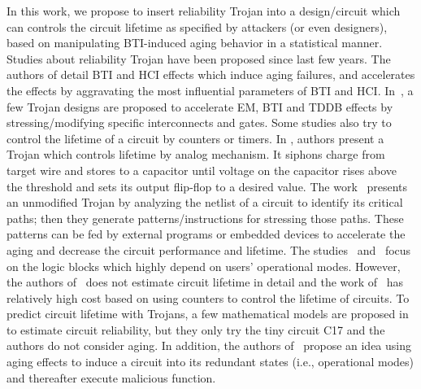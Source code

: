 In this work, we propose to insert reliability Trojan into a design/circuit which can controls the circuit lifetime as specified by attackers (or even designers), based on manipulating BTI-induced aging behavior in a statistical manner. Studies about reliability Trojan have been proposed since last few years. The authors of \cite{shiyanovskii2010process} detail BTI and HCI effects which induce aging failures, and accelerates the effects by aggravating the most influential parameters of BTI and HCI. In~\cite{sreedhar2012reliability}, a few Trojan designs are proposed to accelerate EM, BTI and TDDB effects by stressing/modifying specific interconnects and gates. Some studies also try to control the lifetime of a circuit by counters or timers. In \cite{yang2016a2}, authors present a Trojan which controls lifetime by analog mechanism. It siphons charge from target wire and stores to a capacitor until voltage on the capacitor rises above the threshold and sets its output flip-flop to a desired value. The work~\cite{karimi2015magic} presents an unmodified Trojan by analyzing the netlist of a circuit to identify its critical paths; then they generate patterns/instructions for stressing those paths. These patterns can be fed by external programs or embedded devices to accelerate the aging and decrease the circuit performance and lifetime. The studies~\cite{yang2016a2} and~\cite{karimi2015magic} focus on the logic blocks which highly depend on users' operational modes. However, the authors of~\cite{shiyanovskii2010process} does not estimate circuit lifetime in detail and the work of~\cite{sreedhar2012reliability} has relatively high cost based on using counters to control the lifetime of circuits. To predict circuit lifetime with Trojans, a few mathematical models are proposed in~\cite{burman2012effect} to estimate circuit reliability, but they only try the tiny circuit C17 and the authors do not consider aging. In addition, the authors of~\cite{wei2013undetectable} propose an idea using aging effects to induce a circuit into its redundant states (i.e., operational modes) and thereafter execute malicious function.


